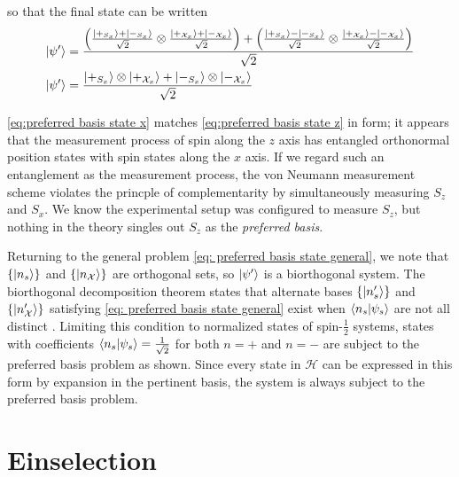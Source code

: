 so that the final state can be written
\begin{align} \label{eq:preferred basis state x}
  \ket{\psi'} &= \frac{ \left(\frac{\ket{+_{S_x}} + \ket{-_{S_x}}}{\sqrt{2}} \otimes \frac{\ket{+_{\mathcal{X}_x}} + \ket{-_{\mathcal{X}_x}}}{\sqrt{2}} \right) +  \left(\frac{\ket{+_{S_x}} - \ket{-_{S_x}}}{\sqrt{2}} \otimes \frac{\ket{+_{\mathcal{X}_x}} - \ket{-_{\mathcal{X}_x}}}{\sqrt{2}} \right) }{\sqrt{2}} \\ \nonumber
  \ket{\psi'} &= \frac{\ket{+_{S_x}} \otimes \ket{+_{\mathcal{X}_x}} + \ket{-_{S_x}} \otimes \ket{-_{\mathcal{X}_x}}}{\sqrt{2}}
\end{align}

\autoref{eq:preferred basis state x} matches \autoref{eq:preferred basis state z} in form; it appears that the measurement process of spin along the $z$ axis has entangled orthonormal position states with spin states along the $x$ axis. If we regard such an entanglement as the measurement process, the von Neumann measurement scheme violates the princple of complementarity by simultaneously measuring $S_z$ and $S_x$. We know the experimental setup was configured to measure $S_z$, but nothing in the theory singles out $S_z$ as the \textit{preferred basis}.

Returning to the general problem \autoref{eq: preferred basis state general}, we note that $\{ \ket{n_s} \}$ and $\{ \ket{n_\mathcal{X}} \}$ are orthogonal sets, so $\ket{\psi'}$ is a biorthogonal system. The biorthogonal decomposition theorem states that alternate bases $\{ \ket{n'_s} \}$ and $\{ \ket{n'_\mathcal{X}} \}$ satisfying \autoref{eq: preferred basis state general} exist when $\braket{n_s | \psi_s}$ are not all distinct \cite{Elby}. Limiting this condition to normalized states of spin-$\frac{1}{2}$ systems, states with coefficients $\braket{n_s | \psi_s} = \frac{1}{\sqrt{2}}$ for both $n = +$ and $n = -$ are subject to the preferred basis problem as shown. Since every state in $\mathcal{H}$ can be expressed in this form by expansion in the pertinent basis, the system is always subject to the preferred basis problem.

\section{Einselection}

